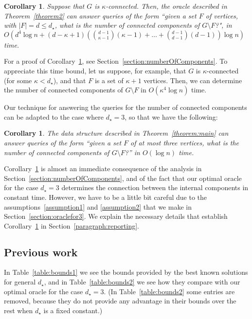 \documentclass[11pt,a4paper]{article}
\newtheorem{corollary}[theorem]{Corollary}
\begin{document}
\begin{corollary}
\label{corollary:componentsKappa}
Suppose that $G$ is $\kappa$-connected. Then, the oracle described in Theorem~\ref{theorem2} can answer queries of the form ``given a set $F$ of vertices, with $|F|=d\leq d_{\star}$, what is the number of connected components of $G\setminus F$?", in $O(d^4\log{n} + (d-\kappa+1)({d-1\choose\kappa-1}(\kappa-1)+\dots+{d-1\choose d-1}(d-1))\log{n})$ time.
\end{corollary}

For a proof of Corollary~\ref{corollary:componentsKappa}, see Section~\ref{section:numberOfComponents}. To appreciate this time bound, let us suppose, for example, that $G$ is $\kappa$-connected (for some $\kappa<d_{\star}$), and that $F$ is a set of $\kappa+1$ vertices. Then, we can determine the number of connected components of $G\setminus F$ in $O(\kappa^4\log{n})$ time. 

Our technique for answering the queries for the number of connected components can be adapted to the case where $d_{\star}=3$, so that we have the following:

\begin{corollary}
\label{corollary:components3}
The data structure described in Theorem~\ref{theorem:main} can answer queries of the form ``given a set $F$ of at most three vertices, what is the number of connected components of $G\setminus F$?'' in $O(\log n)$ time. 
\end{corollary}

Corollary~\ref{corollary:components3} is almost an immediate consequence of the analysis in Section~\ref{section:numberOfComponents}, and of the fact that our optimal oracle for the case $d_{\star}=3$ determines the connection between the internal components in constant time. However, we have to be a little bit careful due to the assumptions~\ref{assumption1} and \ref{assumption2} that we make in Section~\ref{section:oraclefor3}. We explain the necessary details that establish Corollary~\ref{corollary:components3} in Section~\ref{paragraph:reporting}.

\subsection{Previous work}
\label{section:previouswork}
In Table~\ref{table:bounds1} we see the bounds provided by the best known solutions for general $d_{\star}$, and in Table~\ref{table:bounds2} we see how they compare with our optimal oracle for the case $d_{\star}=3$. (In Table~\ref{table:bounds2} some entries are removed, because they do not provide any advantage in their bounds over the rest when $d_{\star}$ is a fixed constant.)
\end{document}
